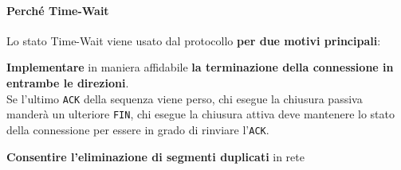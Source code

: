 \documentclass[10pt]{article}
\begin{document}
\paragraph{Perché Time-Wait} Lo stato Time-Wait viene usato dal protocollo \textbf{per due motivi principali}:
\begin{list}{-}{}
\item \textbf{Implementare} in maniera affidabile \textbf{la terminazione della connessione in entrambe le direzioni}.\\
Se l'ultimo \texttt{ACK} della sequenza viene perso, chi esegue la chiusura passiva manderà un ulteriore \texttt{FIN}, chi esegue la chiusura attiva deve mantenere lo stato della connessione per essere in grado di rinviare l'\texttt{ACK}.
\item \textbf{Consentire l'eliminazione di segmenti duplicati} in rete
\end{list}
\pagebreak
\end{document}
